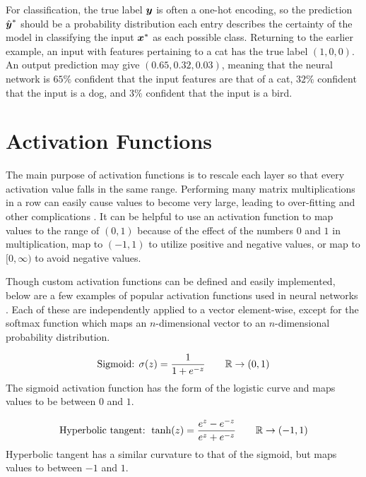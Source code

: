 For classification, the true label $\boldsymbol{y}$ is often a one-hot encoding, so the prediction $\hat{\boldsymbol{y}}^*$ should be a probability distribution each entry describes the certainty of the model in classifying the input $\boldsymbol{x}^*$ as each possible class. Returning to the earlier example, an input with features pertaining to a cat has the true label $(1,0,0)$. An output prediction may give $(0.65, 0.32, 0.03)$, meaning that the neural network is $65\%$ confident that the input features are that of a cat, $32\%$ confident that the input is a dog, and $3\%$ confident that the input is a bird.

\section{Activation Functions} \label{apdx:activation_fcns}
The main purpose of activation functions is to rescale each layer so that every activation value falls in the same range. Performing many matrix multiplications in a row can easily cause values to become very large, leading to over-fitting and other complications \cite{sibi2013}. It can be helpful to use an activation function to map values to the range of $(0,1)$ because of the effect of the numbers $0$ and $1$ in multiplication, map to $(-1,1)$ to utilize positive and negative values, or map to $[0,\infty)$ to avoid negative values. 

Though custom activation functions can be defined and easily implemented, below are a few examples of popular activation functions used in neural networks \cite{tensorflow} \cite{keras_r}. Each of these are independently applied to a vector element-wise, except for the softmax function which maps an $n$-dimensional vector to an $n$-dimensional probability distribution.

\begin{equation}
  \text{Sigmoid: } \sigma(z) = \frac{1}{1 + e^{-z}} \quad \quad \mathbb{R} \to (0,1) 
  \label{eq:sigmoid_eqn}
\end{equation}
The sigmoid activation function has the form of the logistic curve and maps values to be between $0$ and $1$.

\begin{equation}
  \text{Hyperbolic tangent: } \tanh(z) = \frac{e^z - e^{-z}}{e^z + e^{-z}} \quad \quad \mathbb{R} \to (-1,1)
  \label{eq:tanh_eqn}
\end{equation}
Hyperbolic tangent has a similar curvature to that of the sigmoid, but maps values to between $-1$ and $1$. 

